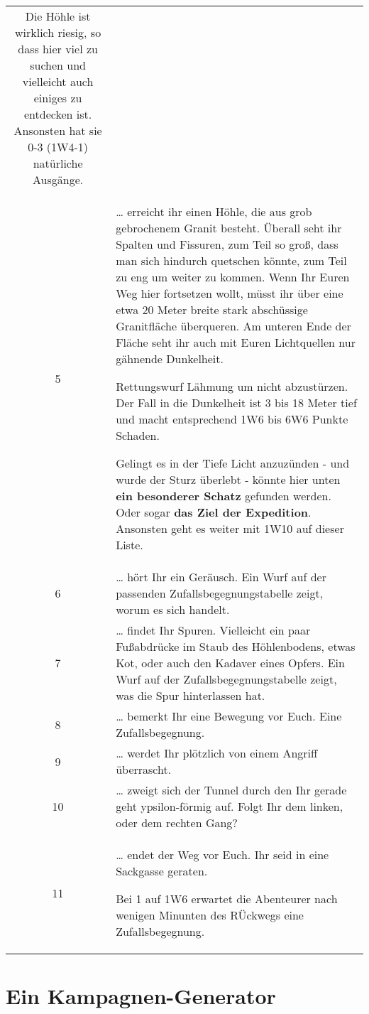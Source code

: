 \documentclass[11pt]{wbzine}
\begin{document}
\begin{tabularx}{\columnwidth}{cZ}
  Die Höhle ist wirklich riesig, so dass hier viel zu suchen und
  vielleicht auch einiges zu entdecken ist. Ansonsten hat sie 0-3
  (1W4-1) natürliche Ausgänge.
\\
5 & 
  \ldots{} erreicht ihr einen Höhle, die aus grob gebrochenem Granit
  besteht. Überall seht ihr Spalten und Fissuren, zum Teil so groß, dass
  man sich hindurch quetschen könnte, zum Teil zu eng um weiter zu
  kommen. Wenn Ihr Euren Weg hier fortsetzen wollt, müsst ihr über eine
  etwa 20 Meter breite stark abschüssige Granitfläche überqueren. Am
  unteren Ende der Fläche seht ihr auch mit Euren Lichtquellen nur
  gähnende Dunkelheit.

  Rettungswurf Lähmung um nicht abzustürzen. Der Fall in die Dunkelheit
  ist 3 bis 18 Meter tief und macht entsprechend 1W6 bis 6W6 Punkte
  Schaden.

  Gelingt es in der Tiefe Licht anzuzünden - und wurde der Sturz
  überlebt - könnte hier unten \textbf{ein besonderer Schatz} gefunden
  werden. Oder sogar \textbf{das Ziel der Expedition}. Ansonsten geht es
  weiter mit 1W10 auf dieser Liste.
\\
6 & 
  \ldots{} hört Ihr ein Geräusch. Ein Wurf auf der passenden
  Zufallsbegegnungstabelle zeigt, worum es sich handelt.
\\
7 & 
  \ldots{} findet Ihr Spuren. Vielleicht ein paar Fußabdrücke im Staub
  des Höhlenbodens, etwas Kot, oder auch den Kadaver eines Opfers. Ein
  Wurf auf der Zufallsbegegnungstabelle zeigt, was die Spur hinterlassen
  hat.
\\
8 & 
  \ldots{} bemerkt Ihr eine Bewegung vor Euch. Eine Zufallsbegegnung.
\\
9 & 
  \ldots{} werdet Ihr plötzlich von einem Angriff überrascht.
\\
10 & 
  \ldots{} zweigt sich der Tunnel durch den Ihr gerade geht
  ypsilon-förmig auf. Folgt Ihr dem linken, oder dem rechten Gang?
\\
11 & 
  \ldots{} endet der Weg vor Euch. Ihr seid in eine Sackgasse geraten.

  Bei 1 auf 1W6 erwartet die Abenteurer nach wenigen Minunten des
  RÜckwegs eine Zufallsbegegnung. \\

\end{tabularx}

\section{Ein Kampagnen-Generator}
\end{document}

